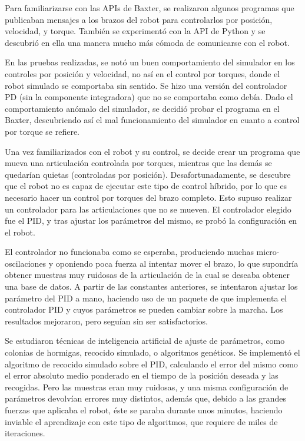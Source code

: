 Para familiarizarse con las APIs de Baxter, se realizaron algunos programas que publicaban mensajes a los brazos del robot para controlarlos por posición, velocidad, y torque. También se experimentó con la API de Python y se descubrió en ella una manera mucho más cómoda de comunicarse con el robot.

En las pruebas realizadas, se notó un buen comportamiento del simulador en los controles por posición y velocidad, no así en el control por torques, donde el robot simulado se comportaba sin sentido. Se hizo una versión del controlador PD (sin la componente integradora) que no se comportaba como debía. Dado el comportamiento anómalo del simulador, se decidió probar el programa en el Baxter, descubriendo así el mal funcionamiento del simulador en cuanto a control por torque se refiere.

Una vez familiarizados con el robot y su control, se decide crear un programa que mueva una articulación controlada por torques, mientras que las demás se quedarían quietas (controladas por posición). Desafortunadamente, se descubre que el robot no es capaz de ejecutar este tipo de control híbrido, por lo que es necesario hacer un control por torques del brazo completo. Esto supuso realizar un controlador para las articulaciones que no se mueven. El controlador elegido fue el PID, y tras ajustar los parámetros del mismo, se probó la configuración en el robot.

El controlador no funcionaba como se esperaba, produciendo muchas micro-oscilaciones y oponiendo poca fuerza al intentar mover el brazo, lo que supondría obtener muestras muy ruidosas de la articulación de la cual se deseaba obtener una base de datos. A partir de las constantes anteriores, se intentaron ajustar los parámetro del PID a mano, haciendo uso de un paquete de \ros que implementa el controlador PID y cuyos parámetros se pueden cambiar sobre la marcha. Los resultados mejoraron, pero seguían sin ser satisfactorios.

Se estudiaron técnicas de inteligencia artificial de ajuste de parámetros, como colonias de hormigas, recocido simulado, o algoritmos genéticos. Se implementó el algoritmo de recocido simulado sobre el PID, calculando el error del mismo como el error absoluto medio ponderado en el tiempo de la posición deseada y las recogidas. Pero las muestras eran muy ruidosas, y una misma configuración de parámetros devolvían errores muy distintos, además que, debido a las grandes fuerzas que aplicaba el robot, éste se paraba durante unos minutos, haciendo inviable el aprendizaje con este tipo de algoritmos, que requiere de miles de iteraciones.

